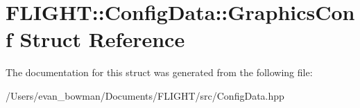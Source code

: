 \hypertarget{struct_f_l_i_g_h_t_1_1_config_data_1_1_graphics_conf}{}\section{F\+L\+I\+G\+HT\+:\+:Config\+Data\+:\+:Graphics\+Conf Struct Reference}
\label{struct_f_l_i_g_h_t_1_1_config_data_1_1_graphics_conf}


The documentation for this struct was generated from the following file\+:\begin{DoxyCompactItemize}
\item 
/\+Users/evan\+\_\+bowman/\+Documents/\+F\+L\+I\+G\+H\+T/src/Config\+Data.\+hpp\end{DoxyCompactItemize}
